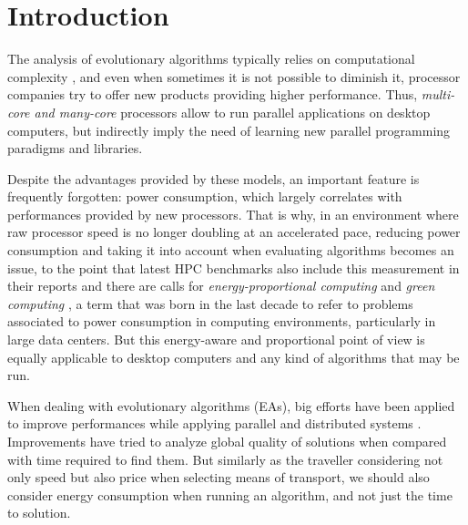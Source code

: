 \section{Introduction}

The analysis of evolutionary algorithms typically relies on computational complexity \cite{complexity}, %
 and even when sometimes it is not possible to diminish it, processor
 companies try to offer new products providing higher performance.
 Thus, \textit{multi-core and many-core} processors allow to run
 parallel applications on desktop computers, but indirectly imply the
 need of learning new parallel programming paradigms and libraries. %

Despite the advantages provided by these models, an important feature
is frequently forgotten:  power consumption, which largely correlates
with performances provided by new processors. That is why, in an
environment where raw processor speed is no longer doubling at an
accelerated pace, reducing power consumption and taking it into
account when evaluating algorithms becomes an issue, to the point that
latest HPC benchmarks also include this measurement in their reports
and there are calls for {\em energy-proportional computing}
\cite{barroso2007case} and 
\textit{green computing} \cite{green-computing}, a term that was born in the last decade to refer
to problems associated to power consumption in computing environments,
particularly in large data centers. But this
energy-aware and proportional point of view is equally applicable to desktop computers
and any kind of algorithms that may be run. 

When dealing with evolutionary algorithms (EAs), big efforts have been
applied to improve performances while applying parallel and
distributed systems \cite{paba}.  Improvements have tried to analyze
global quality of solutions when compared with time required to find
them.   
But similarly as the traveller considering not only speed but also
price when selecting means of transport, we should also consider
energy consumption when running an algorithm, and not just the time to
solution.  %

